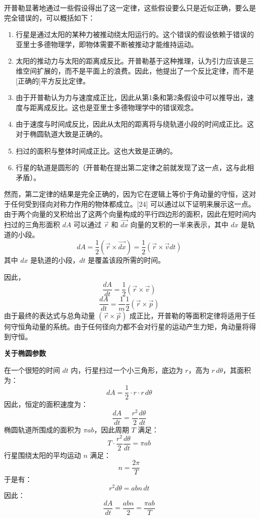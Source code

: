开普勒显著地通过一些假设得出了这一定律，这些假设要么只是近似正确，要么是完全错误的，可以概括如下：
\begin{enumerate}
\item 行星是通过太阳的某种力被推动绕太阳运行的。这个错误的假设依赖于错误的亚里士多德物理学，即物体需要不断被推动才能维持运动。 
\item 太阳的推动力与太阳的距离成反比。开普勒基于这种推理，认为引力应该是三维空间扩展的，而不是平面上的浪费。因此，他提出了一个反比定律，而不是[正确的]平方反比定律。 
\item 由于开普勒认为力与速度成正比，因此从第1条和第2条假设中可以推导出，速度与距离成反比。这也是亚里士多德物理学中的错误观念。
\item 由于速度与时间成反比，因此从太阳的距离将与绕轨道小段的时间成正比。这对于椭圆轨道大致是正确的。
\item 扫过的面积与整体时间成正比。这也大致是正确的。
\item 行星的轨道是圆形的（开普勒在提出第二定律之前就发现了这一点，这与此相矛盾）。
\end{enumerate}
然而，第二定律的结果是完全正确的，因为它在逻辑上等价于角动量的守恒，这对于任何受到径向对称力作用的物体都成立。[24] 可以通过以下证明来展示这一点。由于两个向量的叉积给出了这两个向量构成的平行四边形的面积，因此在短时间内扫过的三角形面积 \( dA \) 可以通过 \( \vec{r} \) 和 \( \vec{dx} \) 向量的叉积的一半来表示，其中 \( dx \) 是轨道的小段。
\[
dA = \frac{1}{2} (\vec{r} \times \vec{dx}) = \frac{1}{2} (\vec{r} \times \vec{v} dt)~
\]
其中 \( dx \) 是轨道的小段，\( dt \) 是覆盖该段所需的时间。

因此，
\[
\frac{dA}{dt} = \frac{1}{2} (\vec{r} \times \vec{v})~
\]
\[
\frac{dA}{dt} = \frac{1}{m} \frac{1}{2} (\vec{r} \times \vec{p})~
\]
由于最终的表达式与总角动量 \( (\vec{r} \times \vec{p}) \) 成正比，开普勒的等面积定律将适用于任何守恒角动量的系统。由于任何径向力都不会对行星的运动产生力矩，角动量将得到守恒。

\textbf{关于椭圆参数}

在一个很短的时间 \( dt \) 内，行星扫过一个小三角形，底边为 \( r \)，高为 \( r \, d\theta \)，其面积为：
\[
dA = \frac{1}{2} \cdot r \cdot r \, d\theta~
\]
因此，恒定的面积速度为：
\[
\frac{dA}{dt} = \frac{r^{2}}{2} \frac{d\theta}{dt}~
\]
椭圆轨道所围成的面积为 \( \pi ab \)，因此周期 \( T \) 满足：
\[
T \cdot \frac{r^{2}}{2} \frac{d\theta}{dt} = \pi ab~
\]
行星围绕太阳的平均运动 \( n \) 满足：
\[
n = \frac{2\pi}{T}~
\]
于是有：
\[
r^{2} d\theta = abn \, dt~
\]
因此：
\[
\frac{dA}{dt} = \frac{abn}{2} = \frac{\pi ab}{T}~
\]
